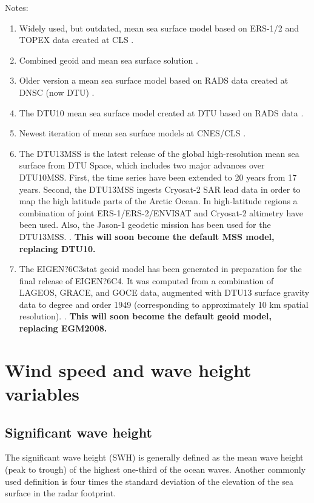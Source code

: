 \documentclass[a4paper,11pt,openany,natbib]{thesis}
\begin{document}
Notes:
\begin{enumerate}
\item Widely used, but outdated, mean sea surface model based on ERS-1/2 and TOPEX data created at CLS \citep{hernandez2001}.\label{item:mss_cls01}
\item Combined geoid and mean sea surface solution \citep{pavlis2008}.\label{item:mss_egm2008}\label{item:geoid_egm2008}
\item Older version a mean sea surface model based on RADS data created at DNSC (now DTU) \citep{andersen2009}.\label{item:mss_dnsc2008}
\item The DTU10 mean sea surface model created at DTU based on RADS data \citep{andersen2010}.\label{item:mss_dtu10}
\item Newest iteration of mean sea surface models at CNES/CLS \citep{schaeffer2012}.\label{item:mss_cls11}
\item The DTU13MSS is the latest release of the global high-resolution mean sea surface from DTU Space, which includes two major advances over DTU10MSS. First, the time series have been extended to 20 years from 17 years. Second, the DTU13MSS ingests Cryosat-2 SAR lead data in order to map the high latitude parts of the Arctic Ocean. In high-latitude regions a combination of joint ERS-1/ERS-2/ENVISAT and Cryosat-2 altimetry have been used. Also, the Jason-1 geodetic mission has been used for the DTU13MSS. \citep{andersen2013a}.\label{item:mss_dtu13}
\textbf{This will soon become the default MSS model, replacing DTU10.}
\item The EIGEN?6C3stat geoid model has been generated in preparation for the final release of EIGEN?6C4. It was computed from a combination of LAGEOS, GRACE, and GOCE data, augmented with DTU13 surface gravity data to degree and order 1949 (corresponding to approximately 10 km spatial resolution). \citep{forste2013,shako2014}.\label{item:geoid_eigen6}
\textbf{This will soon become the default geoid model, replacing EGM2008.}
\end{enumerate}

\chapter{Wind speed and wave height variables}
\section{Significant wave height}
\label{var:swh}
The significant wave height (SWH) is generally defined as the mean wave height (peak to trough) of the highest one-third of the ocean waves. Another commonly used definition is four times the standard deviation of the elevation of the sea surface in the radar footprint.
\end{document}
